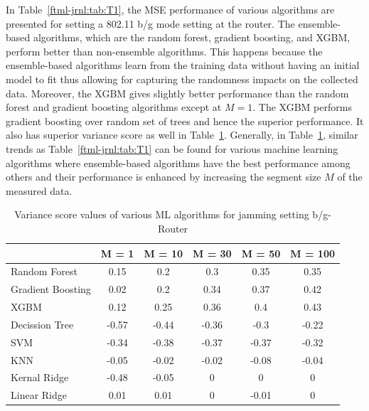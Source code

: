 In Table~\ref{ftml-jrnl:tab:T1}, the MSE performance of various algorithms are presented for setting a 802.11 b/g mode setting at the router. The ensemble-based algorithms, which are the random forest, gradient boosting, and XGBM, perform better than non-ensemble algorithms. This happens because the ensemble-based algorithms learn from the training data without having an initial model to fit thus allowing for capturing the randomness impacts on the collected data. Moreover, the XGBM gives slightly better performance than the random forest and gradient boosting algorithms except at $M=1$. The XGBM performs gradient boosting over random set of trees and hence the superior performance. It also has superior variance score as well in Table~\ref{ftml-jrnl:tab:T2}. Generally, in Table~\ref{ftml-jrnl:tab:T2}, similar trends as Table~\ref{ftml-jrnl:tab:T1} can be found for various machine learning algorithms where ensemble-based algorithms have the best performance among others and their performance is enhanced by increasing the segment size $M$ of the measured data.

\begin{table}[!ht]
	\centering
	\caption{Variance score values of various ML algorithms for jamming setting b/g-Router}
	\begin{tabular}{|p{5.3em}|c|c|c|c|c|}
		\toprule
		& \multicolumn{1}{p{2.4em}|}{M = 1} & \multicolumn{1}{p{2.9em}|}{M = 10} & \multicolumn{1}{p{2.9em}|}{M = 30} & \multicolumn{1}{p{2.9em}|}{M = 50} & \multicolumn{1}{p{3.4em}|}{M = 100} \\
		\midrule
		Random Forest	 & 0.15  & 0.2   & 0.3   & 0.35  & 0.35 \\
		\midrule
		Gradient Boosting  & 0.02  & 0.2   & 0.34  & 0.37  & 0.42 \\
		\midrule
		XGBM  & 0.12  & 0.25  & 0.36  & 0.4   & 0.43 \\
		\midrule
		Decission Tree & -0.57 & -0.44 & -0.36 & -0.3  & -0.22 \\
		\midrule
		SVM   & -0.34 & -0.38 & -0.37 & -0.37 & -0.32 \\
		\midrule
		KNN   & -0.05 & -0.02 & -0.02 & -0.08 & -0.04 \\
		\midrule
		Kernal Ridge & -0.48 & -0.05 & 0     & 0     & 0 \\
		\midrule
		Linear Ridge & 0.01  & 0.01  & 0     & -0.01 & 0 \\
		\bottomrule
	\end{tabular}%
	\label{ftml-jrnl:tab:T2}%
\end{table}%


